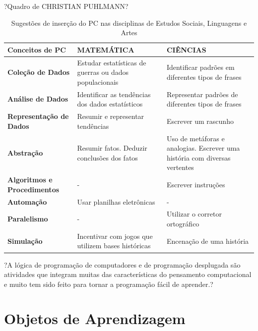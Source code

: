 \documentclass[12pt, openright, a4paper, brazil, openany, oneside]{abntex2}
\begin{document}
?Quadro de CHRISTIAN PUHLMANN?

\begin{table}[h]
        \centering
        \caption{Sugestões de inserção do PC nas disciplinas de Estudos Sociais, Linguagens e Artes}
                
        \begin{tabular}{ >{\centering\arraybackslash}m{3cm} >{\centering\arraybackslash}m{5.5cm} >{\centering\arraybackslash}m{6cm}}
            \toprule
            \textbf{Conceitos de PC} & \textbf{MATEMÁTICA} & \textbf{CIÊNCIAS} \\
            \midrule
            \textbf{Coleção de Dados} & Estudar estatísticas de guerras ou dados populacionais  & Identificar padrões em diferentes tipos de frases \\
            \midrule
            \textbf{Análise de Dados} & Identificar as tendências dos dados estatísticos & Representar padrões de diferentes tipos de frases  \\
            \midrule
            \textbf{Representação de Dados} & Resumir e representar tendências & Escrever um rascunho \\
            \midrule
            \textbf{Abstração} & Resumir fatos. Deduzir conclusões dos fatos & Uso de metáforas e analogias. Escrever uma história com diversas vertentes \\
            \midrule
            \textbf{Algoritmos e Procedimentos} & - & Escrever instruções \\
            \midrule
            \textbf{Automação} & Usar planilhas eletrônicas & - \\
            \midrule
            \textbf{Paralelismo} & - & Utilizar o corretor ortográfico \\
            \midrule
            \textbf{Simulação} & Incentivar com jogos que utilizem bases históricas & Encenação de uma história \\
            \bottomrule
        \end{tabular}
    \end{table}

?A lógica de programação de computadores e de programação desplugada são atividades que integram muitas das características do pensamento computacional e muito tem sido feito para tornar a programação fácil de aprender.?


\chapter{Objetos de Aprendizagem}
\end{document}
